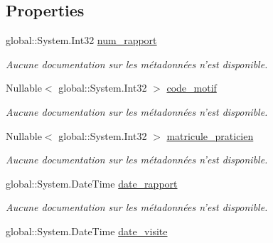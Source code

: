 \subsection*{Properties}
\begin{DoxyCompactItemize}
\item 
global\-::\-System.\-Int32 \hyperlink{class_model_1_1_r_a_p_p_o_r_t___d_e___v_i_s_i_t_e_a09579a805a9a16ca3d590de786e1f2ff}{num\-\_\-rapport}
\begin{DoxyCompactList}\small\item\em Aucune documentation sur les métadonnées n'est disponible. \end{DoxyCompactList}\item 
Nullable$<$ global\-::\-System.\-Int32 $>$ \hyperlink{class_model_1_1_r_a_p_p_o_r_t___d_e___v_i_s_i_t_e_a57873cda816b38fbd05d2e659fb45c35}{code\-\_\-motif}
\begin{DoxyCompactList}\small\item\em Aucune documentation sur les métadonnées n'est disponible. \end{DoxyCompactList}\item 
Nullable$<$ global\-::\-System.\-Int32 $>$ \hyperlink{class_model_1_1_r_a_p_p_o_r_t___d_e___v_i_s_i_t_e_a8afd6d68f9e91bc0eef72f0d6f1d9576}{matricule\-\_\-praticien}
\begin{DoxyCompactList}\small\item\em Aucune documentation sur les métadonnées n'est disponible. \end{DoxyCompactList}\item 
global\-::\-System.\-Date\-Time \hyperlink{class_model_1_1_r_a_p_p_o_r_t___d_e___v_i_s_i_t_e_a0158656f483091006f9c9a9ba5faa9ad}{date\-\_\-rapport}
\begin{DoxyCompactList}\small\item\em Aucune documentation sur les métadonnées n'est disponible. \end{DoxyCompactList}\item 
global\-::\-System.\-Date\-Time \hyperlink{class_model_1_1_r_a_p_p_o_r_t___d_e___v_i_s_i_t_e_a3ededfc7a2aa19b96cb389900c2e6e36}{date\-\_\-visite}

\end{DoxyCompactItemize}
